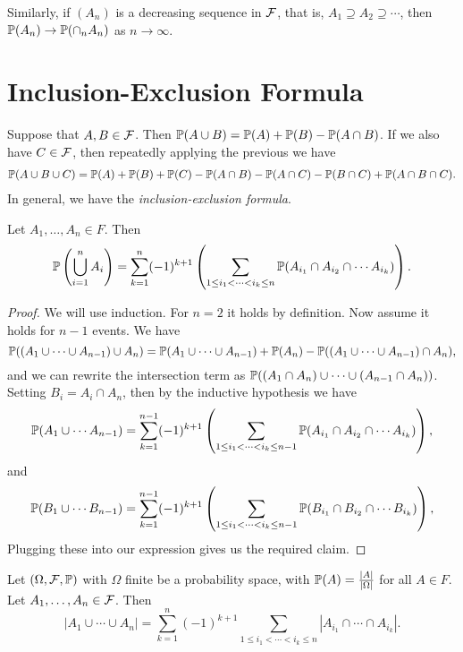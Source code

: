 \documentclass[a4paper]{scrreprt}
\begin{document}
Similarly, if $(A_n)$ is a decreasing sequence in $\mathcal{F}$, that is, $A_1 \supseteq A_2 \supseteq \cdots$, then $\mathbb{P}(A_n) \rightarrow \mathbb{P}(\cap_n A_n)$ as $n \rightarrow \infty$.

\section{Inclusion-Exclusion Formula}

Suppose that $A, B \in \mathcal{F}$. Then $\mathbb{P}(A \cup B) = \mathbb{P}(A) + \mathbb{P}(B) - \mathbb{P}(A \cap B)$. If we also have $C \in \mathcal{F}$, then repeatedly applying the previous we have
\begin{align*}
	\mathbb{P}(A \cup B \cup C) = \mathbb{P}(A) + \mathbb{P}(B) + \mathbb{P}(C) - \mathbb{P}(A \cap B) - \mathbb{P}(A \cap C) - \mathbb{P}(B \cap C) + \mathbb{P}(A \cap B \cap C).
\end{align*}
In general, we have the \emph{inclusion-exclusion formula}.

\begin{proposition}
	Let $A_1, \dots, A_n \in F$. Then
	$$
	\mathbb{P}\left(\bigcup_{i = 1}^n A_i\right) 
	= \sum_{k = 1}^{n} (-1)^{k + 1} \left(\sum_{1 \leq i_1 < \cdots < i_k \leq n} \mathbb{P}(A_{i_1} \cap A_{i_2} \cap \cdots A_{i_k})\right).
	$$
\end{proposition}
\begin{proof}
	We will use induction. For $n = 2$ it holds by definition. Now assume it holds for $n - 1$ events. We have
	$$
	\mathbb{P}((A_1 \cup \cdots \cup A_{n-1}) \cup A_n) = \mathbb{P}(A_1 \cup \cdots \cup A_{n-1}) + \mathbb{P}(A_n) - \mathbb{P}((A_1 \cup \cdots \cup A_{n-1}) \cap A_n),
	$$
	and we can rewrite the intersection term as $\mathbb{P}((A_1 \cap A_n) \cup \cdots \cup (A_{n - 1} \cap A_n))$. Setting $B_i = A_i \cap A_n$, then by the inductive hypothesis we have
	$$
	\mathbb{P}(A_1 \cup \cdots A_{n - 1}) = \sum_{k = 1}^{n-1} (-1)^{k + 1} \left(\sum_{1 \leq i_1 < \cdots < i_k \leq n-1} \mathbb{P}(A_{i_1} \cap A_{i_2} \cap \cdots A_{i_k})\right),
	$$
	and
	$$
	\mathbb{P}(B_1 \cup \cdots B_{n - 1}) = \sum_{k = 1}^{n-1} (-1)^{k + 1} \left(\sum_{1 \leq i_1 < \cdots < i_k \leq n-1} \mathbb{P}(B_{i_1} \cap B_{i_2} \cap \cdots B_{i_k})\right),
	$$
	Plugging these into our expression gives us the required claim.
\end{proof}

Let $(\Omega, \mathcal{F}, \mathbb{P})$ with $\Omega$ finite be a probability space, with $\mathbb{P}(A) = \frac{|A|}{|\Omega|}$ for all $A \in F$. Let $A_1, \dots, A_n \in \mathcal{F}$. Then
$$
|A_1 \cup \cdots \cup A_n| = \sum_{k = 1}^n (-1)^{k + 1} \sum_{1 \leq i_1 < \cdots < i_k \leq n} |A_{i_1} \cap \cdots \cap A_{i_k}|.
$$
\end{document}
